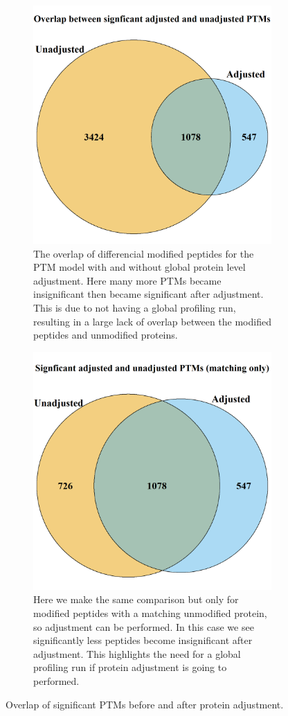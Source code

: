 \documentclass[mcp]{article}
\numberwithin{figure}{section} %
\numberwithin{table}{section}
\begin{document}
\begin{figure}[h!]
\centering
 \begin{subfigure}{\textwidth}
 \centering
	\includegraphics[height=.5\textwidth]{images/usp30_venn_diagramm}
	\caption{The overlap of differencial modified peptides for the PTM model with and without global protein level adjustment. Here many more PTMs became insignificant then became significant after adjustment. This is due to not having a global profiling run, resulting in a large lack of overlap between the modified peptides and unmodified proteins.}
 \end{subfigure}\vspace{-5mm}
 \begin{subfigure}{\textwidth}
 \centering
	\includegraphics[height=.5\textwidth]{images/usp30_venn_diagramm_matching_only}
	\caption{Here we make the same comparison but only for modified peptides with a matching unmodified protein, so adjustment can be performed. In this case we see significantly less peptides become insignificant after adjustment. This highlights the need for a global profiling run if protein adjustment is going to performed.}
 \end{subfigure}
 \caption{Overlap of significant PTMs before and after protein adjustment.}
\label{fig:usp30_ven_d}
\end{figure}
\end{document}

